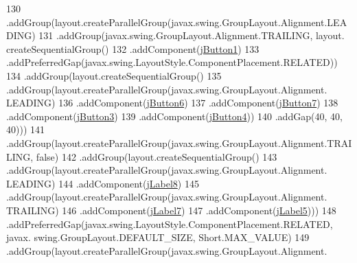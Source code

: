 \begin{DoxyCode}
130                         .addGroup(layout.createParallelGroup(javax.swing.GroupLayout.Alignment.LEADING)
131                             .addGroup(javax.swing.GroupLayout.Alignment.TRAILING, layout.
      createSequentialGroup()
132                                 .addComponent(\mbox{\hyperlink{class_interfaz_package_1_1_consulta_busqueda_a8cbb600ad394d0017b1f7fd24090eae5}{jButton1}})
133                                 .addPreferredGap(javax.swing.LayoutStyle.ComponentPlacement.RELATED))
134                             .addGroup(layout.createSequentialGroup()
135                                 .addGroup(layout.createParallelGroup(javax.swing.GroupLayout.Alignment.
      LEADING)
136                                     .addComponent(\mbox{\hyperlink{class_interfaz_package_1_1_consulta_busqueda_a7cf19c14b7eb6a2bd1e460fcce0c2ffa}{jButton6}})
137                                     .addComponent(\mbox{\hyperlink{class_interfaz_package_1_1_consulta_busqueda_a80ca243a28d5b45e1f3a0e97c5cfb819}{jButton7}})
138                                     .addComponent(\mbox{\hyperlink{class_interfaz_package_1_1_consulta_busqueda_ad28b7024dc55d1785ac611b91dab6030}{jButton3}})
139                                     .addComponent(\mbox{\hyperlink{class_interfaz_package_1_1_consulta_busqueda_a3c5a2c3d6a507e80ad771d8ab4ebd891}{jButton4}}))
140                                 .addGap(40, 40, 40)))
141                         .addGroup(layout.createParallelGroup(javax.swing.GroupLayout.Alignment.TRAILING, \textcolor{keyword}{
      false})
142                             .addGroup(layout.createSequentialGroup()
143                                 .addGroup(layout.createParallelGroup(javax.swing.GroupLayout.Alignment.
      LEADING)
144                                     .addComponent(\mbox{\hyperlink{class_interfaz_package_1_1_consulta_busqueda_ade14e21c50a0fe22a685656e3815a253}{jLabel8}})
145                                     .addGroup(layout.createParallelGroup(javax.swing.GroupLayout.Alignment.
      TRAILING)
146                                         .addComponent(\mbox{\hyperlink{class_interfaz_package_1_1_consulta_busqueda_a999fbcac6f0a6a7bfc57c17612ea2605}{jLabel7}})
147                                         .addComponent(\mbox{\hyperlink{class_interfaz_package_1_1_consulta_busqueda_aa93cd22be90131fea76b2a1b2f113b9b}{jLabel5}})))
148                                 .addPreferredGap(javax.swing.LayoutStyle.ComponentPlacement.RELATED, javax.
      swing.GroupLayout.DEFAULT\_SIZE, Short.MAX\_VALUE)
149                                 .addGroup(layout.createParallelGroup(javax.swing.GroupLayout.Alignment.

\end{DoxyCode}
